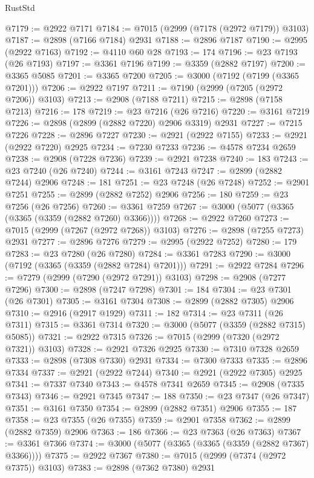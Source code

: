\begin{lexlean}{RustStd}
\begin{coremodule}
@7179 := @2922 @7171
@7184 := @7015 (@2999 (@7178 (@2972 @7179)) @3103)
@7187 := @2898 (@7166 @7184) @2931
@7188 := @2896 @7187
@7190 := @2995 (@2922 @7163)
@7192 := @4110 @60 @28
@7193 := 174
@7196 := @23 @7193 (@26 @7193)
@7197 := @3361 @7196
@7199 := @3359 (@2882 @7197)
@7200 := @3365 @5085
@7201 := @3365 @7200
@7205 := @3000 (@7192 (@7199 (@3365 @7201)))
@7206 := @2922 @7197
@7211 := @7190 (@2999 (@7205 (@2972 @7206)) @3103)
@7213 := @2908 (@7188 @7211)
@7215 := @2898 (@7158 @7213)
@7216 := 178
@7219 := @23 @7216 (@26 @7216)
@7220 := @3161 @7219
@7226 := @2898 (@2899 (@2882 @7220) @2906 @3319) @2931
@7227 := @7215 @7226
@7228 := @2896 @7227
@7230 := @2921 (@2922 @7155)
@7233 := @2921 (@2922 @7220) @2925
@7234 := @7230 @7233
@7236 := @4578 @7234 @2659
@7238 := @2908 (@7228 @7236)
@7239 := @2921 @7238
@7240 := 183
@7243 := @23 @7240 (@26 @7240)
@7244 := @3161 @7243
@7247 := @2899 (@2882 @7244) @2906
@7248 := 181
@7251 := @23 @7248 (@26 @7248)
@7252 := @2901 @7251
@7255 := @2899 (@2882 @7252) @2906
@7256 := 180
@7259 := @23 @7256 (@26 @7256)
@7260 := @3361 @7259
@7267 := @3000 (@5077 (@3365 (@3365 (@3359 (@2882 @7260) @3366))))
@7268 := @2922 @7260
@7273 := @7015 (@2999 (@7267 (@2972 @7268)) @3103)
@7276 := @2898 (@7255 @7273) @2931
@7277 := @2896 @7276
@7279 := @2995 (@2922 @7252)
@7280 := 179
@7283 := @23 @7280 (@26 @7280)
@7284 := @3361 @7283
@7290 := @3000 (@7192 (@3365 (@3359 (@2882 @7284) @7201)))
@7291 := @2922 @7284
@7296 := @7279 (@2999 (@7290 (@2972 @7291)) @3103)
@7298 := @2908 (@7277 @7296)
@7300 := @2898 (@7247 @7298)
@7301 := 184
@7304 := @23 @7301 (@26 @7301)
@7305 := @3161 @7304
@7308 := @2899 (@2882 @7305) @2906
@7310 := @2916 (@2917 @1929)
@7311 := 182
@7314 := @23 @7311 (@26 @7311)
@7315 := @3361 @7314
@7320 := @3000 (@5077 (@3359 (@2882 @7315) @5085))
@7321 := @2922 @7315
@7326 := @7015 (@2999 (@7320 (@2972 @7321)) @3103)
@7328 := @2921 @7326 @2925
@7330 := @7310 @7328 @2659
@7333 := @2898 (@7308 @7330) @2931
@7334 := @7300 @7333
@7335 := @2896 @7334
@7337 := @2921 (@2922 @7244)
@7340 := @2921 (@2922 @7305) @2925
@7341 := @7337 @7340
@7343 := @4578 @7341 @2659
@7345 := @2908 (@7335 @7343)
@7346 := @2921 @7345
@7347 := 188
@7350 := @23 @7347 (@26 @7347)
@7351 := @3161 @7350
@7354 := @2899 (@2882 @7351) @2906
@7355 := 187
@7358 := @23 @7355 (@26 @7355)
@7359 := @2901 @7358
@7362 := @2899 (@2882 @7359) @2906
@7363 := 186
@7366 := @23 @7363 (@26 @7363)
@7367 := @3361 @7366
@7374 := @3000 (@5077 (@3365 (@3365 (@3359 (@2882 @7367) @3366))))
@7375 := @2922 @7367
@7380 := @7015 (@2999 (@7374 (@2972 @7375)) @3103)
@7383 := @2898 (@7362 @7380) @2931

\end{coremodule}
\end{lexlean}
